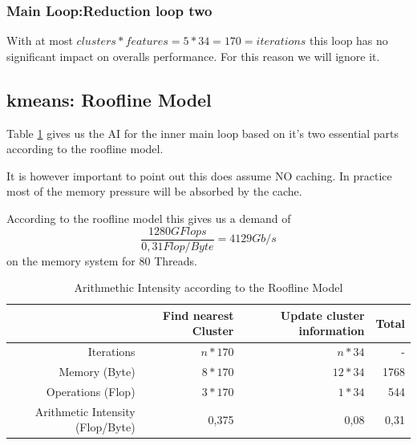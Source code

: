 \subsubsection{Main Loop:Reduction loop two}
With at most $clusters * features = 5 * 34 = 170 = iterations$ this loop has no significant impact on overalls performance.
For this reason we will ignore it.

\subsection{kmeans: Roofline Model}

Table \ref{tab:AI} gives us the AI for the inner main loop based on it's two essential parts according to the roofline model.

It is however important to point out this does assume NO caching. In practice most of the memory pressure will be absorbed by the cache.

According to the roofline model this gives us a demand of $$\frac{1280GFlops}{0,31Flop/Byte} = 4129 Gb/s$$ on the memory system for 80 Threads.

\begin{table}[ht]
	\centering
	\caption{Arithmethic Intensity according to the Roofline Model}
	\label{tab:AI}
	\begin{tabular}{|r|r|r|r|}
		\hline
		& Find nearest Cluster & Update cluster information & Total \\ \hline
		Iterations           & $n * 170$            & $n*34$                     & -     \\ \hline
		Memory (Byte)              & $8*170$              & $12*34$                      & 1768  \\ \hline
		Operations (Flop)          & $3*170$              & $1*34$                       & 544   \\ \hline
		Arithmetic Intensity (Flop/Byte) & 0,375                & 0,08                       & 0,31  \\ \hline
	\end{tabular}
\end{table}

